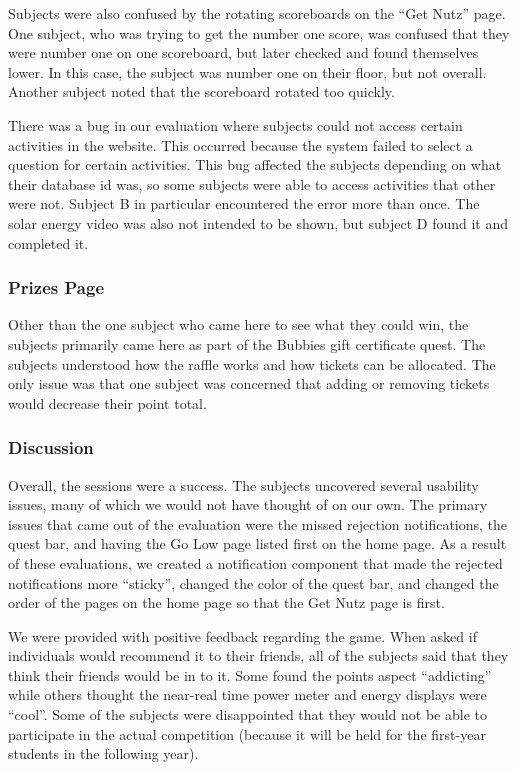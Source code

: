 Subjects were also confused by the rotating scoreboards on the ``Get Nutz'' page. One subject, who was trying to get the number one score, was confused that they were number one on one scoreboard, but later checked and found themselves lower. In this case, the subject was number one on their floor, but not overall. Another subject noted that the scoreboard rotated too quickly.

There was a bug in our evaluation where subjects could not access certain activities in the website. This occurred because the system failed to select a question for certain activities. This bug affected the subjects depending on what their database id was, so some subjects were able to access activities that other were not. Subject B in particular encountered the error more than once. The solar energy video was also not intended to be shown, but subject D found it and completed it.

\subsubsection{Prizes Page}

Other than the one subject who came here to see what they could win, the subjects primarily came here as part of the Bubbies gift certificate quest. The subjects understood how the raffle works and how tickets can be allocated. The only issue was that one subject was concerned that adding or removing tickets would decrease their point total.

\subsubsection{Discussion}

Overall, the sessions were a success. The subjects uncovered several usability issues, many of which we would not have thought of on our own. The primary issues that came out of the evaluation were the missed rejection notifications, the quest bar, and having the Go Low page listed first on the home page. As a result of these evaluations, we created a notification component that made the rejected notifications more ``sticky'', changed the color of the quest bar, and changed the order of the pages on the home page so that the Get Nutz page is first.

We were provided with positive feedback regarding the game. When asked if individuals would recommend it to their friends, all of the subjects said that they think their friends would be in to it. Some found the points aspect ``addicting'' while others thought the near-real time power meter and energy displays were ``cool''. Some of the subjects were disappointed that they would not be able to participate in the actual competition (because it will be held for the first-year students in the following year).

